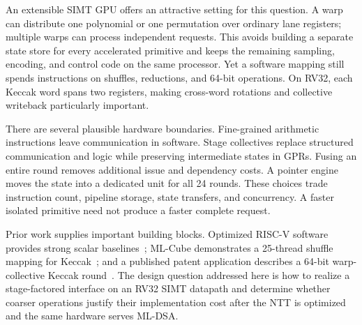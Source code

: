 \documentclass[conference,letterpaper]{IEEEtran}
\begin{document}
An extensible SIMT GPU offers an attractive setting for this question.
A warp can distribute one polynomial or one permutation over ordinary lane
registers; multiple warps can process independent requests. This avoids
building a separate state store for every accelerated primitive and keeps
the remaining sampling, encoding, and control code on the same processor.
Yet a software mapping still spends instructions on shuffles, reductions,
and 64-bit operations. On RV32, each Keccak word spans two registers, making
cross-word rotations and collective writeback particularly important.

There are several plausible hardware boundaries. Fine-grained arithmetic
instructions leave communication in software. Stage collectives replace
structured communication and logic while preserving intermediate states in
GPRs. Fusing an entire round removes additional issue and dependency costs.
A pointer engine moves the state into a dedicated unit for all 24 rounds.
These choices trade instruction count, pipeline storage, state transfers,
and concurrency. A faster isolated primitive need not produce a faster
complete request.

Prior work supplies important building blocks. Optimized RISC-V software
provides strong scalar baselines~\cite{pqrv}; ML-Cube demonstrates a
25-thread shuffle mapping for Keccak~\cite{mlcube}; and a published
patent application describes a 64-bit warp-collective Keccak
round~\cite{collectivepatent}. The design question addressed here is how to
realize a stage-factored interface on an RV32 SIMT datapath and determine
whether coarser operations justify their implementation cost after the
NTT is optimized and the same hardware serves ML-DSA.
\end{document}
